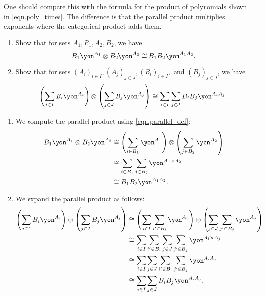 \documentclass[Book-Poly]{subfiles}
\begin{document}
One should compare this with the formula for the product of polynomials shown in \eqref{eqn.poly_times}. The difference is that the parallel product multiplies exponents where the categorical product adds them.

\begin{exercise} \label{exc.general_poly_parallel_times}
  \begin{enumerate}
    \item \label{exc.general_poly_parallel_times.monomial} Show that for sets $A_1, B_1, A_2, B_2$, we have
    \[
    B_1\yon^{A_1} \otimes B_2\yon^{A_2} \iso B_1 B_2\yon^{A_1 A_2}.
    \]
    \item \label{exc.general_poly_parallel_times.polynomial} Show that for sets $(A_i)_{i \in I},(A_j)_{j \in J},(B_i)_{i \in I},$ and $(B_j)_{j \in J}$, we have
    \[
    \left(\sum_{i \in I} B_i\yon^{A_i}\right) \otimes \left(\sum_{j \in J} B_j\yon^{A_j}\right) \iso \sum_{i \in I} \sum_{j \in J} B_i B_j \yon^{A_i A_j}.
    \]
  \end{enumerate}
  \begin{solution}
    \begin{enumerate}
      \item We compute the parallel product using \eqref{eqn.parallel_def}:
      \begin{align*}
        B_1\yon^{A_1} \otimes B_2\yon^{A_2} &\iso \left(\sum_{i \in B_1} \yon^{A_1}\right) \otimes \left(\sum_{j \in B_2} \yon^{A_2}\right) \\
        &\iso \sum_{i \in B_1} \sum_{j \in B_2} \yon^{A_1 \times A_2} \\
        &\iso B_1 B_2\yon^{A_1 A_2}.
      \end{align*}

      \item We expand the parallel product as follows:
      \begin{align*}
        \left(\sum_{i \in I} B_i\yon^{A_i}\right) \otimes \left(\sum_{j \in J} B_j\yon^{A_j}\right) &\iso \left(\sum_{i \in I} \sum_{i' \in B_i} \yon^{A_i}\right) \otimes \left(\sum_{j \in J} \sum_{j' \in B_j} \yon^{A_j}\right) \\
        &\iso \sum_{i \in I} \sum_{i' \in B_i} \sum_{j \in J} \sum_{j' \in B_j} \yon^{A_i \times A_j} \\
        &\iso \sum_{i \in I} \sum_{j \in J} \sum_{i' \in B_i} \sum_{j' \in B_j} \yon^{A_i A_j} \\
        &\iso \sum_{i \in I} \sum_{j \in J} B_i B_j \yon^{A_i A_j}.
      \end{align*}
    \end{enumerate}
  \end{solution}
\end{exercise}
\end{document}
